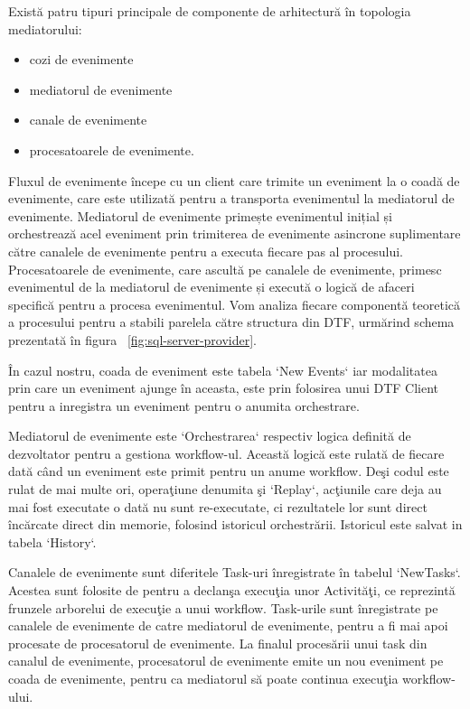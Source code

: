 \par Există patru tipuri principale de componente de arhitectură în topologia mediatorului: 
\begin{itemize}
\item cozi de evenimente
\item mediatorul de evenimente
\item canale de evenimente
\item procesatoarele de evenimente. 
\end{itemize}
\par Fluxul de evenimente începe cu un client care trimite un eveniment la o coadă de evenimente, care este utilizată pentru a transporta evenimentul la mediatorul de evenimente. Mediatorul de evenimente primește evenimentul inițial și orchestrează acel eveniment prin trimiterea de evenimente asincrone suplimentare către canalele de evenimente pentru a executa fiecare pas al procesului. Procesatoarele de evenimente, care ascultă pe canalele de evenimente, primesc evenimentul de la mediatorul de evenimente și execută o logică de afaceri specifică pentru a procesa evenimentul.  Vom analiza fiecare componentă teoretică a procesului pentru a stabili parelela către structura din DTF, urmărind schema prezentată în figura ~\ref{fig:sql-server-provider}.
\par În cazul nostru, coada de eveniment este tabela `New Events` iar modalitatea prin care un eveniment ajunge în aceasta, este prin folosirea unui DTF Client pentru a inregistra un eveniment pentru o anumita orchestrare. 
\par Mediatorul de evenimente este `Orchestrarea` respectiv logica definită de dezvoltator pentru a gestiona workflow-ul. Această logică este rulată de fiecare dată când un eveniment este primit pentru un anume workflow. Deşi codul este rulat de mai multe ori, operaţiune denumita şi `Replay`, acţiunile care deja au mai fost executate o dată nu sunt re-executate, ci rezultatele lor sunt direct încărcate direct din memorie, folosind istoricul orchestrării. Istoricul este salvat in tabela `History`.
\par Canalele de evenimente sunt diferitele Task-uri înregistrate în tabelul `NewTasks`. Acestea sunt folosite de pentru a declanşa execuţia unor Activităţi, ce reprezintă frunzele arborelui de execuţie a unui workflow. Task-urile sunt înregistrate pe canalele de evenimente de catre mediatorul de evenimente, pentru a fi mai apoi procesate de procesatorul de evenimente. La finalul procesării unui task din canalul de evenimente, procesatorul de evenimente emite un nou eveniment pe coada de evenimente, pentru ca mediatorul să poate continua execuţia workflow-ului. 
